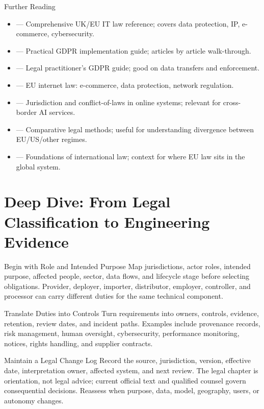 \begin{v3topic}{Further Reading}
    \begin{itemize}
        \item {} --- Comprehensive UK/EU IT law reference; covers data protection, IP, e-commerce, cybersecurity.
        \item {} --- Practical GDPR implementation guide; articles by article walk-through.
        \item {} --- Legal practitioner's GDPR guide; good on data transfers and enforcement.
        \item {} --- EU internet law: e-commerce, data protection, network regulation.
        \item {} --- Jurisdiction and conflict-of-laws in online systems; relevant for cross-border AI services.
        \item {} --- Comparative legal methods; useful for understanding divergence between EU/US/other regimes.
        \item {} --- Foundations of international law; context for where EU law sits in the global system.
    \end{itemize}
\end{v3topic}

%
\section{Deep Dive: From Legal Classification to Engineering Evidence}
\begin{v3topic}{Begin with Role and Intended Purpose}
Map jurisdictions, actor roles, intended purpose, affected people, sector,
data flows, and lifecycle stage before selecting obligations.
Provider, deployer, importer, distributor, employer, controller, and processor
can carry different duties for the same technical component.

\end{v3topic}
\begin{v3topic}{Translate Duties into Controls}
Turn requirements into owners, controls, evidence, retention, review dates, and
incident paths.
Examples include provenance records, risk management, human oversight,
cybersecurity, performance monitoring, notices, rights handling, and supplier
contracts.

\end{v3topic}
\begin{v3topic}{Maintain a Legal Change Log}
Record the source, jurisdiction, version, effective date, interpretation owner,
affected system, and next review.
The legal chapter is orientation, not legal advice; current official text and
qualified counsel govern consequential decisions.
Reassess when purpose, data, model, geography, users, or autonomy changes.
\end{v3topic}


